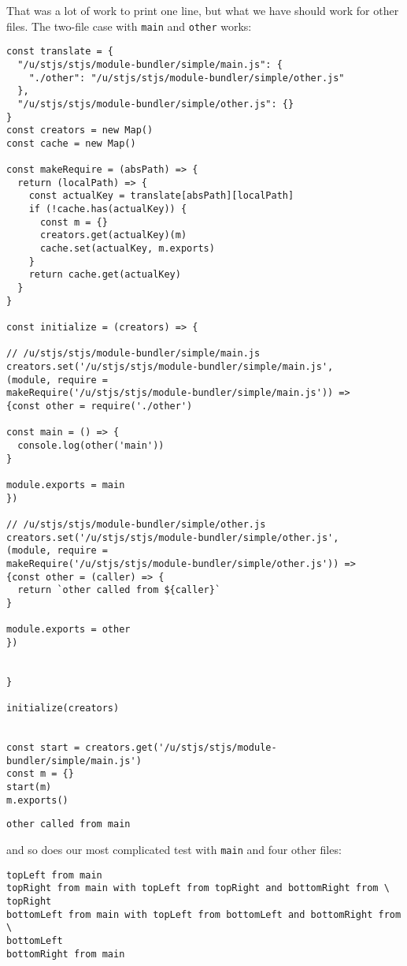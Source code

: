 \documentclass[krantzl]{krantz}
\begin{document}
That was a lot of work to print one line,
but what we have should work for other files.
The two-file case with \texttt{main} and \texttt{other} works:


\begin{lstlisting}[frame=tblr]
const translate = {
  "/u/stjs/stjs/module-bundler/simple/main.js": {
    "./other": "/u/stjs/stjs/module-bundler/simple/other.js"
  },
  "/u/stjs/stjs/module-bundler/simple/other.js": {}
}
const creators = new Map()
const cache = new Map()

const makeRequire = (absPath) => {
  return (localPath) => {
    const actualKey = translate[absPath][localPath]
    if (!cache.has(actualKey)) {
      const m = {}
      creators.get(actualKey)(m)
      cache.set(actualKey, m.exports)
    }
    return cache.get(actualKey)
  }
}

const initialize = (creators) => {

// /u/stjs/stjs/module-bundler/simple/main.js
creators.set('/u/stjs/stjs/module-bundler/simple/main.js',
(module, require =
makeRequire('/u/stjs/stjs/module-bundler/simple/main.js')) =>
{const other = require('./other')

const main = () => {
  console.log(other('main'))
}

module.exports = main
})

// /u/stjs/stjs/module-bundler/simple/other.js
creators.set('/u/stjs/stjs/module-bundler/simple/other.js',
(module, require =
makeRequire('/u/stjs/stjs/module-bundler/simple/other.js')) =>
{const other = (caller) => {
  return `other called from ${caller}`
}

module.exports = other
})


}

initialize(creators)


const start = creators.get('/u/stjs/stjs/module-bundler/simple/main.js')
const m = {}
start(m)
m.exports()
\end{lstlisting}



\begin{lstlisting}[frame=tblr,backgroundcolor=\color{black!5}]
other called from main
\end{lstlisting}



\noindent and so does our most complicated test with \texttt{main} and four other files:


\begin{lstlisting}[frame=tblr,backgroundcolor=\color{black!5}]
topLeft from main
topRight from main with topLeft from topRight and bottomRight from \
topRight
bottomLeft from main with topLeft from bottomLeft and bottomRight from \
bottomLeft
bottomRight from main
\end{lstlisting}
\end{document}
